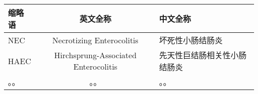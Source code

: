 \begin{nomenclaturename}
\label{chap:symb}

\begin{table}[htbp]
  \centering
 \begin{tabular}{lcl}
  \toprule
  缩略语 & 英文全称 & 中文全称 \\
  \midrule
 NEC & Necrotizing Enterocolitis & 坏死性小肠结肠炎 \\
 HAEC & Hirchsprung-Associated Enterocolitis & 先天性巨结肠相关性小肠结肠炎 \\
 。。 & 。。 & 。。 \\
  \bottomrule
 \end{tabular}
\end{table}

\end{nomenclaturename}
